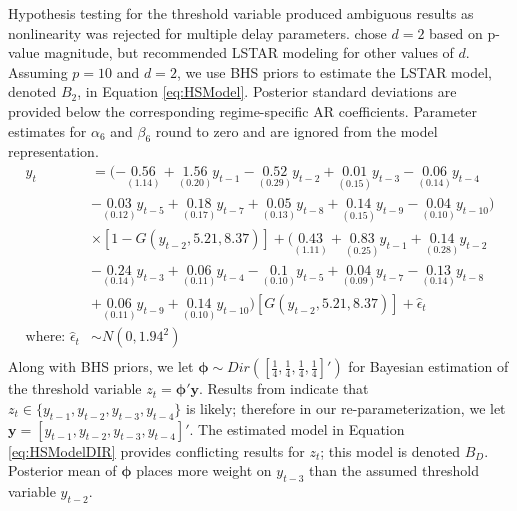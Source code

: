 Hypothesis testing for the threshold variable produced ambiguous results as nonlinearity was rejected for multiple delay parameters. \cite{Terasvirta2010} chose $d=2$ based on p-value magnitude, but recommended LSTAR modeling for other values of $d$. Assuming $p=10$ and $d=2$, we use BHS priors to estimate the LSTAR model, denoted $B_2$, in Equation \ref{eq:HSModel}. Posterior standard deviations are provided below the corresponding regime-specific AR coefficients. Parameter estimates for $\alpha_6$ and $\beta_6$ round to zero and are ignored from the model representation.
\begin{equation}
\begin{split}
 	y_t &=(-\underset{(1.14)}{0.56}+\underset{(0.20)}{1.56}y_{t-1}-\underset{(0.29)}{0.52}y_{t-2}+\underset{(0.15)}{0.01}y_{t-3}-\underset{(0.14)}{0.06}y_{t-4}\\
 	&-\underset{(0.12)}{0.03}y_{t-5} +\underset{(0.17)}{0.18}y_{t-7}+\underset{(0.13)}{0.05}y_{t-8}+\underset{(0.15)}{0.14}y_{t-9}-\underset{(0.10)}{0.04}y_{t-10})\\
 	&\times[1-G(y_{t-2},5.21,8.37)]+(\underset{(1.11)}{0.43}+\underset{(0.25)}{0.83}y_{t-1}+\underset{(0.28)}{0.14}y_{t-2}\\
 	&-\underset{(0.14)}{0.24}y_{t-3}+\underset{(0.11)}{0.06}y_{t-4}-\underset{(0.10)}{0.1}y_{t-5}
+\underset{(0.09)}{0.04}y_{t-7}-\underset{(0.14)}{0.13}y_{t-8}\\
&+\underset{(0.11)}{0.06}y_{t-9}+\underset{(0.10)}{0.14}y_{t-10})[G(y_{t-2},5.21,8.37)]+\hat{\epsilon}_t\\
 	\textrm{where: }  \hat{\epsilon}_t &\sim N(0, 1.94^2)\\
\end{split}
\label{eq:HSModel}
\end{equation}
Along with BHS priors, we let $\bm{\phi} \sim Dir ([\frac{1}{4},\frac{1}{4},\frac{1}{4},\frac{1}{4}]')$ for Bayesian estimation of the threshold variable $z_t=\bm{\phi}'\bm{y}$. Results from \cite{Terasvirta2010} indicate that $z_t \in \{y_{t-1},y_{t-2},y_{t-3},y_{t-4}\}$ is likely; therefore in our re-parameterization, we let $\bm{y}=[y_{t-1},y_{t-2},y_{t-3},y_{t-4}]'$. The estimated model in Equation \ref{eq:HSModelDIR} provides conflicting results for $z_t$; this model is denoted $B_D$. Posterior mean of $\bm{\phi}$ places more weight on $y_{t-3}$ than the assumed threshold variable $y_{t-2}$.
